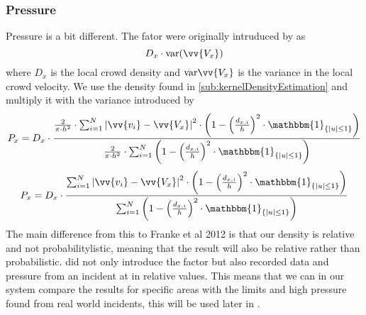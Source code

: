 


\subsubsection{Pressure}
Pressure is a bit different. The fator were originally intruduced by \citet{empircalstudy} as 
\begin{equation}
D_x \cdot \text{var}(\vv{V_x})
\end{equation}
where $D_x$ is the local crowd density and $\text{var}\vv{V_x}$ is the variance in the local crowd velocity. We use the density found in \cref{sub:kernelDensityEstimation} and multiply it with the variance introduced by \citet{wirz2012inferring}
\begin{equation}
\label{eq:}
P_x = D_x \cdot \frac{\frac{2}{\pi \cdot h^2} \cdot \sum_{i=1}^{N} \left|\vv{v_i} - \vv{V_x}\right|^2 \cdot \left(1-\left(\frac{d_{x,i}}{h}\right)^2 \cdot \mathbbm{1}_{\{|u| \leq 1\} }\right)}{\frac{2}{\pi \cdot h^2} \cdot \sum_{i=1}^{N} \left(1-\left(\frac{d_{x,i}}{h}\right)^2 \cdot \mathbbm{1}_{\{|u| \leq 1\} }\right)}
\end{equation}
\begin{equation}
\label{eq:}
P_x = D_x \cdot \frac{\sum_{i=1}^{N} \left|\vv{v_i} - \vv{V_x}\right|^2 \cdot \left(1-\left(\frac{d_{x,i}}{h}\right)^2 \cdot \mathbbm{1}_{\{|u| \leq 1\} }\right)}{\sum_{i=1}^{N} \left(1-\left(\frac{d_{x,i}}{h}\right)^2 \cdot \mathbbm{1}_{\{|u| \leq 1\} }\right)}
\end{equation}
The main difference from this to Franke et al 2012 is that our density is relative and not probabilitylistic, meaning that the result will also be relative rather than probabilistic.  did not only introduce the factor but also recorded data and pressure from an incident at  in relative values. This means that we can in our system compare the results for specific areas with the limits and high pressure found from real world incidents, this will be used later in .